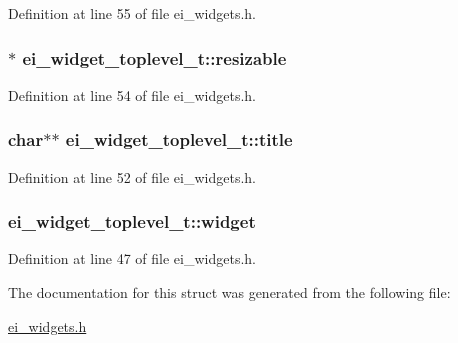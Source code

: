 Definition at line 55 of file ei\-\_\-widgets.\-h.

\hypertarget{structei__widget__toplevel__t_aed16de4bb496bbe2e6695303c10fe659}{
\subsubsection[{resizable}]{$\ast$ ei\-\_\-widget\-\_\-toplevel\-\_\-t\-::resizable}}\label{structei__widget__toplevel__t_aed16de4bb496bbe2e6695303c10fe659}


Definition at line 54 of file ei\-\_\-widgets.\-h.

\hypertarget{structei__widget__toplevel__t_af5bec3cdb770dc13da82acef806a8215}{
\subsubsection[{title}]{\setlength{\rightskip}{0pt plus 5cm}char$\ast$$\ast$ ei\-\_\-widget\-\_\-toplevel\-\_\-t\-::title}}\label{structei__widget__toplevel__t_af5bec3cdb770dc13da82acef806a8215}


Definition at line 52 of file ei\-\_\-widgets.\-h.

\hypertarget{structei__widget__toplevel__t_a3babaea121cf413ae2020cea768479b0}{
\subsubsection[{widget}]{ ei\-\_\-widget\-\_\-toplevel\-\_\-t\-::widget}}\label{structei__widget__toplevel__t_a3babaea121cf413ae2020cea768479b0}


Definition at line 47 of file ei\-\_\-widgets.\-h.



The documentation for this struct was generated from the following file\-:\begin{DoxyCompactItemize}
\item 
\hyperlink{ei__widgets_8h}{ei\-\_\-widgets.\-h}\end{DoxyCompactItemize}
